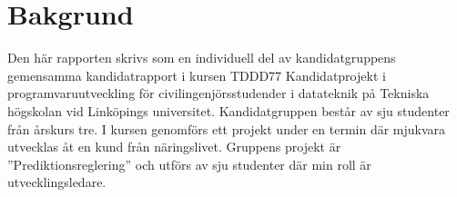 \section{Bakgrund}
Den här rapporten skrivs som en individuell del av kandidatgruppens gemensamma kandidatrapport i kursen TDDD77 Kandidatprojekt i programvaruutveckling för civilingenjörsstudender i datateknik på Tekniska högskolan vid Linköpings universitet. Kandidatgruppen består av sju studenter från årskurs tre. I kursen genomförs ett projekt under en termin där mjukvara utvecklas åt en kund från näringslivet. Gruppens projekt är ''Prediktionsreglering'' och utförs av sju studenter där min roll är utvecklingsledare.
